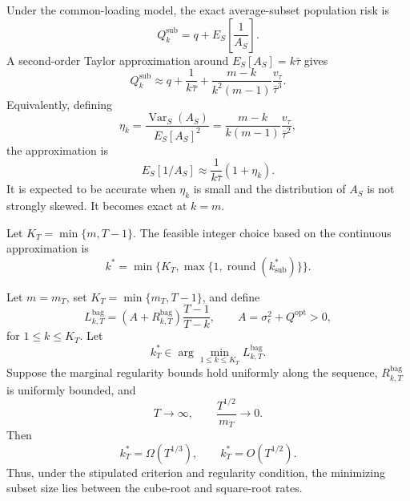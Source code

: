 
\begin{proposition}
Under the common-loading model, the exact average-subset population risk is
\[
 Q_k^{\mathrm{sub}}=q+E_S\!\left[\frac{1}{A_S}\right].
\]
A second-order Taylor approximation around $E_S[A_S]=k\bar\tau$ gives
\[
 Q_k^{\mathrm{sub}}
 \approx
 q+\frac{1}{k\bar\tau}
 +\frac{m-k}{k^2(m-1)}\frac{v_\tau}{\bar\tau^3}.
\]
Equivalently, defining
\[
 \eta_k=
 \frac{\operatorname{Var}_S(A_S)}{E_S[A_S]^2}
 =\frac{m-k}{k(m-1)}\frac{v_\tau}{\bar\tau^2},
\]
the approximation is
\[
 E_S[1/A_S]\approx\frac{1}{k\bar\tau}(1+\eta_k).
\]
It is expected to be accurate when $\eta_k$ is small and the distribution of
$A_S$ is not strongly skewed. It becomes exact at $k=m$.
\end{proposition}

%


Let $K_T=\min\{m,T-1\}$. The feasible integer choice based on the continuous
approximation is
\[
 k^*=\min\{K_T,\max\{1,\operatorname{round}(k_{\mathrm{sub}}^*)\}\}.
\]


\begin{proposition}
Let $m=m_T$, set $K_T=\min\{m_T,T-1\}$, and define
\[
 L_{k,T}^{\mathrm{bag}}
 =
 \left(A+R_{k,T}^{\mathrm{bag}}\right)\frac{T-1}{T-k},
 \qquad
 A=\sigma_\epsilon^2+Q^{\mathrm{opt}}>0,
\]
for $1\le k\le K_T$. Let
\[
 k_T^*\in\arg\min_{1\le k\le K_T}L_{k,T}^{\mathrm{bag}}.
\]
Suppose the marginal regularity bounds hold uniformly along the sequence,
$R_{k,T}^{\mathrm{bag}}$ is uniformly bounded, and
\[
 T\to\infty,
 \qquad
 \frac{T^{1/2}}{m_T}\to0.
\]
Then
\[
 k_T^*=\Omega(T^{1/3}),
 \qquad
 k_T^*=O(T^{1/2}).
\]
Thus, under the stipulated criterion and regularity condition, the minimizing
subset size lies between the cube-root and square-root rates.
\end{proposition}

